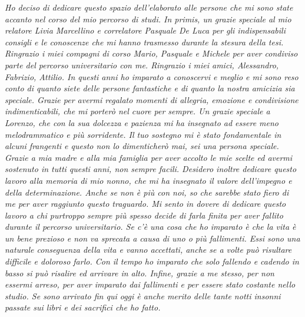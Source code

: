 \documentclass[12pt,italian,a4paper,oneside,openright]{book}
\begin{document}

\noindent \textit{Ho deciso di dedicare questo spazio  dell’elaborato alle persone che mi sono state accanto nel corso del mio percorso di studi. In primis, un grazie speciale al mio relatore Livia Marcellino e correlatore Pasquale De Luca per gli indispensabili consigli e le conoscenze che mi hanno trasmesso durante la stesura della tesi. Ringrazio i miei compagni di corso Mario, Pasquale e Michele per aver condiviso parte del percorso universitario con me. Ringrazio i miei amici, Alessandro, Fabrizio, Attilio. In questi anni ho imparato a conoscervi e meglio e mi sono reso conto di quanto siete delle persone fantastiche e di quanto la nostra amicizia sia speciale. Grazie per avermi regalato momenti di allegria, emozione e condivisione indimenticabili, che mi porterò nel cuore per sempre. Un grazie speciale a Lorenzo, che con la sua dolcezza e pazienza mi ha insegnato ad essere meno melodrammatico e più sorridente. Il tuo sostegno mi è stato fondamentale in alcuni frangenti e questo non lo dimenticherò mai, sei una persona speciale. Grazie a mia madre e alla mia famiglia per aver accolto le mie scelte ed avermi sostenuto in tutti  questi anni, non sempre facili. Desidero inoltre dedicare questo lavoro alla memoria di mio nonno, che mi ha insegnato il valore dell'impegno e della determinazione. Anche se non è più con noi, so che sarebbe stato fiero di me per aver raggiunto questo traguardo. Mi sento in dovere di dedicare questo lavoro a chi purtroppo sempre più spesso decide di farla finita per aver fallito durante il percorso universitario. Se c’è una cosa che ho imparato è che la vita è un bene prezioso e non va sprecata a causa di uno o più fallimenti. Essi sono una naturale conseguenza della vita e vanno accettati, anche se a volte può risultare difficile e doloroso farlo. Con il tempo ho imparato che solo fallendo e cadendo in basso si può risalire ed arrivare in alto. Infine, grazie a me stesso, per non essermi arreso, per aver imparato dai fallimenti e per essere stato costante nello studio. Se sono arrivato fin qui oggi è anche merito delle tante notti insonni passate sui libri e dei sacrifici che ho fatto.}
\newpage

\renewcommand{\listalgorithmname}{Elenco degli algoritmi}



\tableofcontents
\listoffigures
\listofalgorithms
\lstlistoflistings
\listoftables
\newpage







\end{document}
